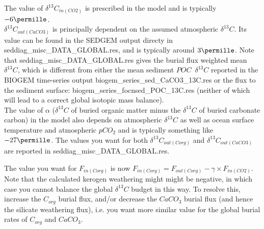 \begin{enumerate}[noitemsep]
The value of \(\delta^{13}C_{in(CO2)}\) is prescribed in the model and is typically \(-6 \permille\).
\vspace{1mm}
\\\(\delta^{13}C_{out(CaCO3)}\) is principally dependent on the assumed atmospheric \(\delta^{13}C\). Its value can be found in the \textsf{\footnotesize SEDGEM} output directy in \textsf{\footnotesize seddiag\_misc\_DATA\_GLOBAL.res}, and is typically around \(3 \permille\). Note that \textsf{\footnotesize seddiag\_misc\_DATA\_GLOBAL.res} gives the burial flux weighted mean \(\delta^{13}C\), which is different from either the mean sediment \(POC \;\ \delta^{13}C\) reported in the \textsf{\footnotesize BIOGEM} time-series output \textsf{\footnotesize biogem\_series\_sed\_CaCO3\_13C.res} or the flux to the sediment surface: \textsf{\footnotesize biogem\_series\_focnsed\_POC\_13C.res} (neither of which will lead to a correct global isotopic mass balance).
\vspace{1mm}
\\The value of \(\alpha\) (\(\delta^{13}C\) of buried organic matter minus the \(\delta^{13}C\) of buried carbonate carbon) in the model also depends on atmospheric \(\delta^{13}C\) as well as ocean surface temperature and atmospheric \(pCO_{2}\) and is typically something like \(-27 \permille\). The values you want for both \(\delta^{13}C_{out(Corg)}\) and \(\delta^{13}C_{out(CaCO3)}\) are reported in \textsf{\footnotesize seddiag\_misc\_DATA\_GLOBAL.res}.

\vspace{2mm}

The value you want for \(F_{in(Corg)}\) is now \(F_{in(Corg)} = F_{out(Corg)} - \gamma \times F_{in(CO2)}\).
\vspace{1mm}
\\Note that the calculated kerogen weathering might might be negative, in which case you cannot balance the global \(\delta^{13}C\) budget in this way. To resolve this, increase the \(C_{org}\) burial flux, and/or decrease the \(CaCO_{3}\) burial flux (and hence the silicate weathering flux), i.e. you want more similar value for the global burial rates of \(C_{org}\) and \(CaCO_{3}\). 

\vspace{2mm}


\end{enumerate}
